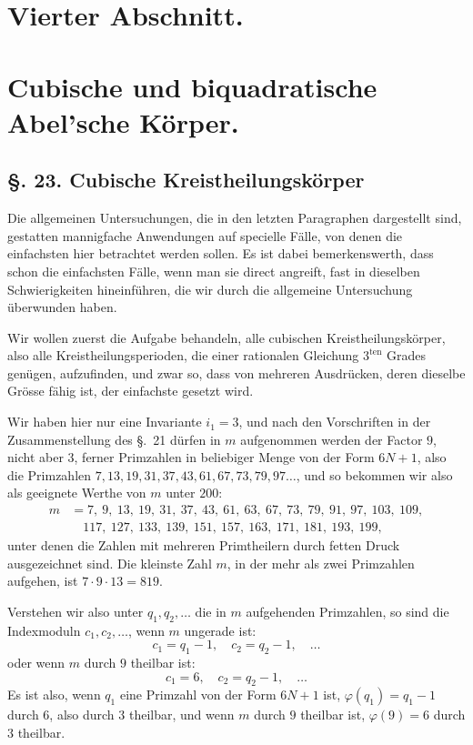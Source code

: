 \documentclass[12pt,a4paper]{article}
\theoremstyle{plain}
\theoremstyle{definition}
\theoremstyle{remark}
\begin{document}
\newpage
\section*{Vierter Abschnitt.}
\section*{Cubische und biquadratische Abel'sche Körper.}

\subsection*{\S. 23. Cubische Kreistheilungskörper}

Die allgemeinen Untersuchungen, die in den letzten Paragraphen dargestellt sind, gestatten mannigfache Anwendungen auf specielle Fälle, von denen die einfachsten hier betrachtet werden sollen. Es ist dabei bemerkenswerth, dass schon die einfachsten Fälle, wenn man sie direct angreift, fast in dieselben Schwierigkeiten hineinführen, die wir durch die allgemeine Untersuchung überwunden haben.

Wir wollen zuerst die Aufgabe behandeln, alle cubischen Kreistheilungskörper, also alle Kreistheilungsperioden, die einer rationalen Gleichung $3^{\text{ten}}$ Grades genügen, aufzufinden, und zwar so, dass von mehreren Ausdrücken, deren dieselbe Grösse fähig ist, der einfachste gesetzt wird.

Wir haben hier nur eine Invariante $i_1 = 3$, und nach den Vorschriften in der Zusammenstellung des \S.~21 dürfen in $m$ aufgenommen werden der Factor $9$, nicht aber $3$, ferner Primzahlen in beliebiger Menge von der Form $6N+1$, also die Primzahlen $7, 13, 19, 31, 37, 43, 61, 67, 73, 79, 97\ldots$, und so bekommen wir also als geeignete Werthe von $m$ unter $200$:
\[
\begin{aligned}
m &= 7,\ 9,\ 13,\ 19,\ 31,\ 37,\ 43,\ 61,\ 63,\ 67,\ 73,\ 79,\ 91,\ 97,\ 103,\ 109, \\
&\quad 117,\ 127,\ 133,\ 139,\ 151,\ 157,\ 163,\ 171,\ 181,\ 193,\ 199,
\end{aligned}
\]
unter denen die Zahlen mit mehreren Primtheilern durch fetten Druck ausgezeichnet sind. Die kleinste Zahl $m$, in der mehr als zwei Primzahlen aufgehen, ist $7 \cdot 9 \cdot 13 = 819$.

Verstehen wir also unter $q_1, q_2, \ldots$ die in $m$ aufgehenden Primzahlen, so sind die Indexmoduln $c_1, c_2, \ldots$, wenn $m$ ungerade ist:
\[
c_1 = q_1 - 1, \quad c_2 = q_2 - 1, \quad \ldots
\]
oder wenn $m$ durch $9$ theilbar ist:
\[
c_1 = 6, \quad c_2 = q_2 - 1, \quad \ldots
\]
Es ist also, wenn $q_1$ eine Primzahl von der Form $6N+1$ ist, $\varphi(q_1) = q_1-1$ durch $6$, also durch $3$ theilbar, und wenn $m$ durch $9$ theilbar ist, $\varphi(9) = 6$ durch $3$ theilbar.
\end{document}
